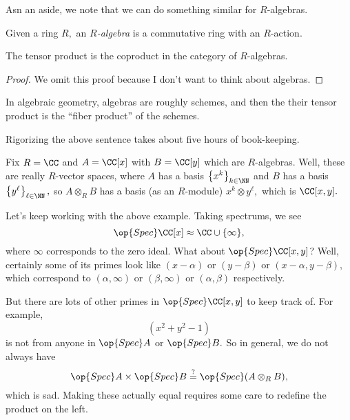\documentclass[../notes.tex]{subfiles}
\begin{document}
Asn an aside, we note that we can do something similar for $R$-algebras.
\begin{defi}[Algebra]
	Given a ring $R,$ an \textit{$R$-algebra} is a commutative ring with an $R$-action.
\end{defi}
\begin{proposition}
	The tensor product is the coproduct in the category of $R$-algebras.
\end{proposition}
\begin{proof}
	We omit this proof because I don't want to think about algebras.
\end{proof}
In algebraic geometry, algebras are roughly schemes, and then the their tensor product is the ``fiber product'' of the schemes.
\begin{remark}
	Rigorizing the above sentence takes about five hours of book-keeping.
\end{remark}
\begin{example}
	Fix $R=\CC$ and $A=\CC[x]$ with $B=\CC[y]$ which are $R$-algebras. Well, these are really $R$-vector spaces, where $A$ has a basis $\left\{x^k\right\}_{k\in\NN}$ and $B$ has a basis $\left\{y^\ell\right\}_{\ell\in\NN},$ so $A\otimes_RB$ has a basis (as an $R$-module) $x^k\otimes y^\ell,$ which is $\CC[x,y].$
\end{example}
Let's keep working with the above example. Taking spectrums, we see
\[\op{Spec}\CC[x]\approx\CC\cup\{\infty\},\]
where $\infty$ corresponds to the zero ideal. What about $\op{Spec}\CC[x,y]$? Well, certainly some of its primes look like $(x-\alpha)$ or $(y-\beta)$ or $(x-\alpha,y-\beta),$ which correspond to $(\alpha,\infty)$ or $(\beta,\infty)$ or $(\alpha,\beta)$ respectively.

But there are lots of other primes in $\op{Spec}\CC[x,y]$ to keep track of. For example,
\[\left(x^2+y^2-1\right)\]
is not from anyone in $\op{Spec}A$ or $\op{Spec}B.$ So in general, we do not always have
\[\op{Spec}A\times\op{Spec}B\stackrel?=\op{Spec}(A\otimes_RB),\]
which is sad. Making these actually equal requires some care to redefine the product on the left.
\end{document}
